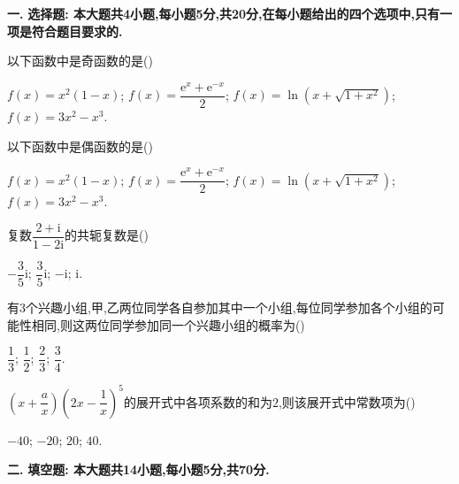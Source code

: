 \documentclass[addpoints,no-math,twoside]{exam} %
\newcommand{\me}{\mathrm{e}} %
\newcommand{\mi}{\mathrm{i}}  %
\begin{document}
\begin{questions}

\item[\bf 一.]{\bf 选择题: 本大题共4小题,每小题5分,共20分,在每小题给出的四个选项中,只有一项是符合题目要求的.}

\question
以下函数中是奇函数的是\hfill(\hspace{2em})

\begin{oneparchoices}
\choice $f(x)=x^2(1-x)$;
\choice $f(x)=\dfrac{\me^x+\me^{-x}}{2}$;
\CorrectChoice $f(x)=\ln(x+\sqrt{1+x^2})$;
\choice $f(x)=3x^2-x^3$.
\end{oneparchoices}

\question
以下函数中是偶函数的是\hfill(\hspace{2em})

\begin{oneparchoices}
\choice $f(x)=x^2(1-x)$;
\CorrectChoice$f(x)=\dfrac{\me^x+\me^{-x}}{2}$;
\choice  $f(x)=\ln(x+\sqrt{1+x^2})$;
\choice $f(x)=3x^2-x^3$.
\end{oneparchoices}

\question
复数$\dfrac{2+\mi}{1-2\mi}$的共轭复数是\hfill(\hspace{2em})

\begin{oneparchoices}
\choice $-\dfrac{3}{5}\mi$;
\CorrectChoice $\dfrac{3}{5}\mi$;
\choice  $-\mi$;
\choice $\mi$.
\end{oneparchoices}

\question
有3个兴趣小组,甲,乙两位同学各自参加其中一个小组,每位同学参加各个小组的可能性相同,则这两位同学参加同一个兴趣小组的概率为\hfill(\hspace{2em})

\begin{oneparchoices}
\choice $\dfrac{1}{3}$;
\CorrectChoice$\dfrac{1}{2}$;
\choice  $\dfrac{2}{3}$;
\choice $\dfrac{3}{4}$.
\end{oneparchoices}

\question
$\left(x+\dfrac{a}{x}\right)\left(2x-\dfrac{1}{x}\right)^5$的展开式中各项系数的和为$2$,则该展开式中常数项为\hfill(\hspace{2em})

\begin{oneparchoices}
\choice $-40$;
\CorrectChoice $-20$;
\choice  $20$;
\choice $40$.
\end{oneparchoices}

\item[\bf 二.]{\bf 填空题: 本大题共14小题,每小题5分,共70分.}


\end{questions}
\end{document}
